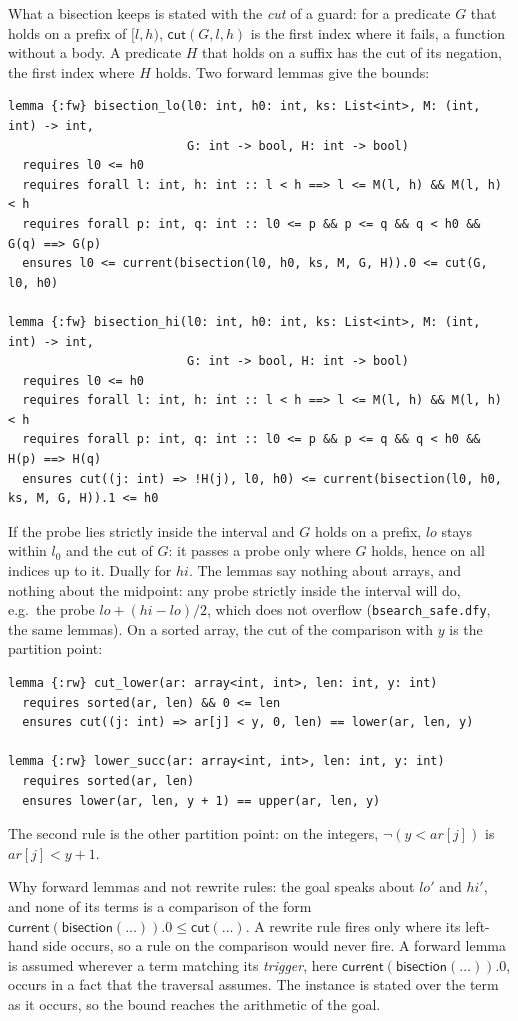 \documentclass[11pt,a4paper]{article}
\newcommand{\cur}{\mathsf{current}}
\begin{document}
What a bisection keeps is stated with the \emph{cut} of a guard: for a predicate $G$ that holds on a prefix of
$[l, h)$, $\mathsf{cut}(G, l, h)$ is the first index where it fails, a function without a body. A predicate $H$
that holds on a suffix has the cut of its negation, the first index where $H$ holds. Two forward lemmas give the
bounds:
\begin{lstlisting}
lemma {:fw} bisection_lo(l0: int, h0: int, ks: List<int>, M: (int, int) -> int,
                         G: int -> bool, H: int -> bool)
  requires l0 <= h0
  requires forall l: int, h: int :: l < h ==> l <= M(l, h) && M(l, h) < h
  requires forall p: int, q: int :: l0 <= p && p <= q && q < h0 && G(q) ==> G(p)
  ensures l0 <= current(bisection(l0, h0, ks, M, G, H)).0 <= cut(G, l0, h0)

lemma {:fw} bisection_hi(l0: int, h0: int, ks: List<int>, M: (int, int) -> int,
                         G: int -> bool, H: int -> bool)
  requires l0 <= h0
  requires forall l: int, h: int :: l < h ==> l <= M(l, h) && M(l, h) < h
  requires forall p: int, q: int :: l0 <= p && p <= q && q < h0 && H(p) ==> H(q)
  ensures cut((j: int) => !H(j), l0, h0) <= current(bisection(l0, h0, ks, M, G, H)).1 <= h0
\end{lstlisting}
If the probe lies strictly inside the interval and $G$ holds on a prefix, $lo$ stays within $l_0$ and the cut of
$G$: it passes a probe only where $G$ holds, hence on all indices up to it. Dually for $hi$. The lemmas say nothing
about arrays, and nothing about the midpoint: any probe strictly inside the interval will do, e.g.\ the probe
$lo + (hi - lo)/2$, which does not overflow (\texttt{bsearch\_safe.dfy}, the same lemmas). On a sorted array, the
cut of the comparison with $y$ is the partition point:
\begin{lstlisting}
lemma {:rw} cut_lower(ar: array<int, int>, len: int, y: int)
  requires sorted(ar, len) && 0 <= len
  ensures cut((j: int) => ar[j] < y, 0, len) == lower(ar, len, y)

lemma {:rw} lower_succ(ar: array<int, int>, len: int, y: int)
  requires sorted(ar, len)
  ensures lower(ar, len, y + 1) == upper(ar, len, y)
\end{lstlisting}
The second rule is the other partition point: on the integers, $\neg(y < ar[j])$ is $ar[j] < y + 1$.

Why forward lemmas and not rewrite rules: the goal speaks about $lo'$ and $hi'$, and none of its terms is a
comparison of the form $\cur(\mathsf{bisection}(\ldots)).0 \le \mathsf{cut}(\ldots)$. A rewrite rule fires only where
its left-hand side occurs, so a rule on the comparison would never fire. A forward lemma is assumed wherever a term
matching its \emph{trigger}, here $\cur(\mathsf{bisection}(\ldots)).0$, occurs in a fact that the traversal assumes.
The instance is stated over the term as it occurs, so the bound reaches the arithmetic of the goal.
\end{document}
